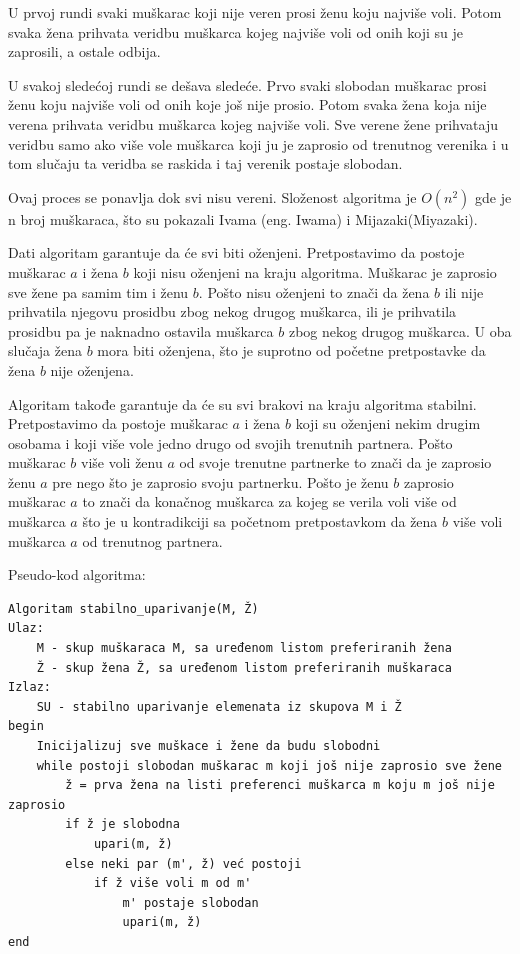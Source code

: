 \documentclass[a4paper]{article}
\begin{document}
U prvoj rundi svaki muškarac koji nije veren prosi ženu koju najviše voli. Potom svaka žena prihvata veridbu muškarca kojeg najviše voli od onih koji su je zaprosili, a ostale odbija.

U svakoj sledećoj rundi se dešava sledeće. Prvo svaki slobodan muškarac prosi ženu koju najviše voli od onih koje još nije prosio. Potom svaka žena koja nije verena prihvata veridbu muškarca kojeg najviše voli. Sve verene žene prihvataju veridbu samo ako više vole muškarca koji ju je zaprosio od trenutnog verenika i u tom slučaju ta veridba se raskida i taj verenik postaje slobodan. 

Ovaj proces se ponavlja dok svi nisu vereni. Složenost algoritma je $O(n^2)$ gde je n broj muškaraca, što su pokazali Ivama (eng. Iwama) i Mijazaki(Miyazaki)\cite{slozenost}. 

Dati algoritam garantuje da će svi biti oženjeni. Pretpostavimo da postoje muškarac $a$ i žena $b$ koji nisu oženjeni na kraju algoritma. Muškarac je zaprosio sve žene pa samim tim i ženu $b$. Pošto nisu oženjeni to znači da žena $b$ ili nije prihvatila njegovu prosidbu zbog nekog drugog muškarca, ili je prihvatila prosidbu pa je naknadno ostavila muškarca $b$ zbog nekog drugog muškarca. U oba slučaja žena $b$ mora biti oženjena, što je suprotno od početne pretpostavke da žena $b$ nije oženjena.

Algoritam takođe garantuje da će su svi brakovi na kraju algoritma stabilni. Pretpostavimo da postoje muškarac $a$ i žena $b$ koji su oženjeni nekim drugim osobama i koji više vole jedno drugo od svojih trenutnih partnera. Pošto muškarac $b$ više voli ženu $a$ od svoje trenutne partnerke to znači da je zaprosio ženu $a$ pre nego što je zaprosio svoju partnerku. Pošto je ženu $b$ zaprosio muškarac $a$ to znači da konačnog muškarca za kojeg se verila voli više od muškarca $a$ što je u kontradikciji sa početnom pretpostavkom da žena $b$ više voli muškarca $a$ od trenutnog partnera.

\newpage

Pseudo-kod algoritma:
\begin{verbatim}
Algoritam stabilno_uparivanje(M, Ž)
Ulaz:
	M - skup muškaraca M, sa uređenom listom preferiranih žena
	Ž - skup žena Ž, sa uređenom listom preferiranih muškaraca
Izlaz:
	SU - stabilno uparivanje elemenata iz skupova M i Ž
begin
    Inicijalizuj sve muškace i žene da budu slobodni
    while postoji slobodan muškarac m koji još nije zaprosio sve žene
        ž = prva žena na listi preferenci muškarca m koju m još nije zaprosio
        if ž je slobodna
            upari(m, ž)
        else neki par (m', ž) već postoji
            if ž više voli m od m'
                m' postaje slobodan
                upari(m, ž)
end
\end{verbatim}
\end{document}
